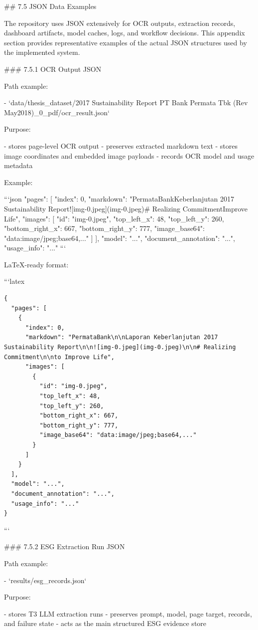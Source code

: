 ## 7.5 JSON Data Examples

The repository uses JSON extensively for OCR outputs, extraction records, dashboard artifacts, model caches, logs, and workflow decisions. This appendix section provides representative examples of the actual JSON structures used by the implemented system.

### 7.5.1 OCR Output JSON

Path example:

- `data/thesis_dataset/2017 Sustainability Report PT Bank Permata Tbk (Rev May2018)_0_pdf/ocr_result.json`

Purpose:

- stores page-level OCR output
- preserves extracted markdown text
- stores image coordinates and embedded image payloads
- records OCR model and usage metadata

Example:

```json
{
  "pages": [
    {
      "index": 0,
      "markdown": "PermataBank\n\nLaporan Keberlanjutan 2017 Sustainability Report\n\n![img-0.jpeg](img-0.jpeg)\n\n# Realizing Commitment\n\nto Improve Life",
      "images": [
        {
          "id": "img-0.jpeg",
          "top_left_x": 48,
          "top_left_y": 260,
          "bottom_right_x": 667,
          "bottom_right_y": 777,
          "image_base64": "data:image/jpeg;base64,..."
        }
      ]
    }
  ],
  "model": "...",
  "document_annotation": "...",
  "usage_info": "..."
}
```

LaTeX-ready format:

```latex
\begin{verbatim}
{
  "pages": [
    {
      "index": 0,
      "markdown": "PermataBank\n\nLaporan Keberlanjutan 2017 Sustainability Report\n\n![img-0.jpeg](img-0.jpeg)\n\n# Realizing Commitment\n\nto Improve Life",
      "images": [
        {
          "id": "img-0.jpeg",
          "top_left_x": 48,
          "top_left_y": 260,
          "bottom_right_x": 667,
          "bottom_right_y": 777,
          "image_base64": "data:image/jpeg;base64,..."
        }
      ]
    }
  ],
  "model": "...",
  "document_annotation": "...",
  "usage_info": "..."
}
\end{verbatim}
```

### 7.5.2 ESG Extraction Run JSON

Path example:

- `results/esg_records.json`

Purpose:

- stores T3 LLM extraction runs
- preserves prompt, model, page target, records, and failure state
- acts as the main structured ESG evidence store

